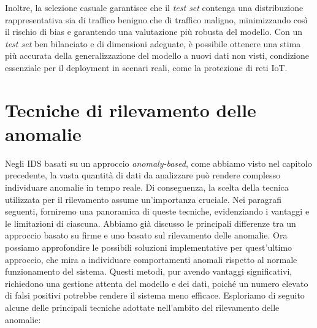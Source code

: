 Inoltre, la selezione casuale garantisce che il \textit{test set} contenga una distribuzione rappresentativa sia di traffico benigno che di traffico maligno, minimizzando così il rischio di bias e garantendo una valutazione più robusta del modello. Con un \textit{test set} ben bilanciato e di dimensioni adeguate, è possibile ottenere una stima più accurata della generalizzazione del modello a nuovi dati non visti, condizione essenziale per il deployment in scenari reali, come la protezione di reti IoT. \cite{DeepLearning}

\section{Tecniche di rilevamento delle anomalie}
Negli IDS basati su un approccio \textit{anomaly-based}, come abbiamo visto nel capitolo precedente, la vasta quantità di dati da analizzare può rendere complesso individuare anomalie in tempo reale. Di conseguenza, la scelta della tecnica utilizzata per il rilevamento assume un'importanza cruciale. Nei paragrafi seguenti, forniremo una panoramica di queste tecniche, evidenziando i vantaggi e le limitazioni di ciascuna.
Abbiamo già discusso le principali differenze tra un approccio basato su firme e uno basato sul rilevamento delle anomalie. Ora possiamo approfondire le possibili soluzioni implementative per quest'ultimo approccio, che mira a individuare comportamenti anomali rispetto al normale funzionamento del sistema. Questi metodi, pur avendo vantaggi significativi, richiedono una gestione attenta del modello e dei dati, poiché un numero elevato di falsi positivi potrebbe rendere il sistema meno efficace. Esploriamo di seguito alcune delle principali tecniche adottate nell'ambito del rilevamento delle anomalie:

